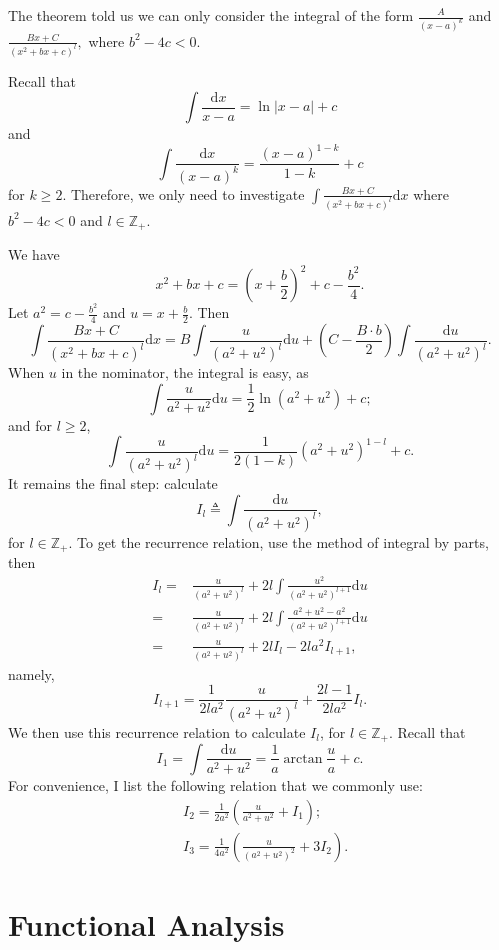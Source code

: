 \documentclass[12pt,a4paper]{article}
\numberwithin{equation}{section}
\theoremstyle{mystyle}
\newcommand{\Z}{\mathbb{Z}}
\renewcommand{\d}{\mathrm{d}}
\newcommand{\abs}[1]{\left\lvert #1 \right\rvert}
\begin{document}
	The theorem told us we can only consider the integral of the form
	$\frac{A}{(x-a)^k}$ and $ \frac{Bx+C}{(x^2+bx+c)^l},$
	where $b^2-4c<0$.
	
	Recall that $$\int \frac{\d x}{x-a} = \ln \abs{x-a}+c$$ and $$\int\frac{\d x}{(x-a)^k}=\frac{(x-a)^{1-k}}{1-k}+c$$ for $k\geq 2$. Therefore, we only need to investigate $\int  \frac{Bx+C}{(x^2+bx+c)^l} \d x$ where $b^2-4c<0$ and $l\in \Z_{+}$.
	
	We have 
	$$
	x^2+bx+c=(x+\frac{b}{2})^2+c-\frac{b^2}{4}.
	$$
	Let $a^2=c-\frac{b^2}{4}$ and $u=x+\frac{b}{2}$. Then
	\[
	\int  \frac{Bx+C}{(x^2+bx+c)^l} \d x = B\int \frac{u}{(a^2+u^2)^l}\d u+(C-\frac{B\cdot b}{2})\int \frac{\d u}{(a^2+u^2)^l}.
	\]
	When $u$ in the nominator, the integral is easy, as 
	$$
	\int \frac{u}{a^2+u^2}\d u=\frac{1}{2}\ln (a^2+u^2)+c;$$ and for $l\geq 2$, 
	$$
	\int \frac{u}{(a^2+u^2)^l}\d u=\frac{1}{2(1-k)}(a^2+u^2)^{1-l}+c.
	$$ It remains the final step: calculate $$I_l\triangleq \int \frac{\d u}{(a^2+u^2)^l},$$ for $l\in \Z_+$.
	To get the recurrence relation, use the method of integral by parts, then
	\begin{align*}
		I_l =& \frac{u}{(a^2+u^2)^l}+2l\int \frac{u^2}{(a^2+u^2)^{l+1}}\d u\\
		=&\frac{u}{(a^2+u^2)^l}+2l\int\frac{a^2+u^2-a^2}{(a^2+u^2)^{l+1}}\d u\\
		=& \frac{u}{(a^2+u^2)^l}+2l I_l - 2la^2 I_{l+1},
	\end{align*}
	namely,
	\begin{equation}
		I_{l+1}=\frac{1}{2la^2}\frac{u}{(a^2+u^2)^l}+\frac{2l-1}{2la^2}I_l.
	\end{equation}
	We then use this recurrence relation to calculate $I_l$, for $l\in \Z_+$. Recall that 
	$$
	I_1=\int \frac{\d u}{a^2+u^2} = \frac{1}{a}\arctan{\frac{u}{a}}+c.
	$$
	For convenience, I list the following relation that we commonly use:
	\begin{align}
		&I_2=\frac{1}{2a^2}\left(\frac{u}{a^2+u^2}+I_1\right);\\
		&I_3 = \frac{1}{4a^2}\left(\frac{u}{(a^2+u^2)^2}+3I_2\right).
	\end{align}
	
	
	
	
	
	
	\part{Functional Analysis}
\end{document}
